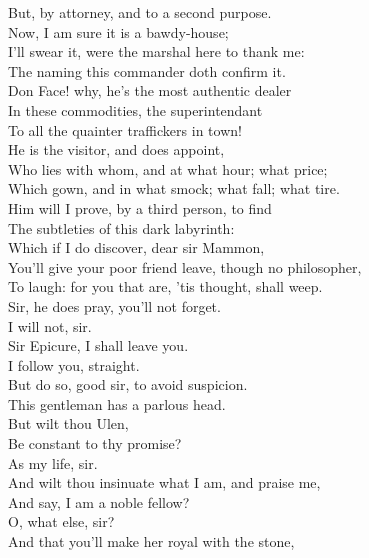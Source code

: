 \documentclass[a4paper,oneside]{memoir}
\begin{document}
\begin{drama*}
But, by attorney, and to a second purpose.\\
Now, I am sure it is a bawdy-house;\\
I'll swear it, were the marshal here to thank me:\\
The naming this commander doth confirm it.\\
Don Face! why, he's the most authentic dealer\\
In these commodities, the superintendant\\
To all the quainter traffickers in town!\\
He is the visitor, and does appoint,\\
Who lies with whom, and at what hour; what price;\\
Which gown, and in what smock; what fall; what tire.\\
Him will I prove, by a third person, to find\\
The subtleties of this dark labyrinth:\\
Which if I do discover, dear sir Mammon,\\
You'll give your poor friend leave, though no philosopher,\\
To laugh: for you that are, 'tis thought, shall weep.\\
\facespeaks Sir, he does pray, you'll not forget.\\
\surlyspeaks {} I will not, sir.\\
Sir Epicure, I shall leave you.\\
\mammonspeaks {} I follow you, straight.\\
\facespeaks But do so, good sir, to avoid suspicion.\\
This gentleman has a parlous head.\\
\mammonspeaks {} But wilt thou Ulen,\\
Be constant to thy promise?\\
\facespeaks {} As my life, sir.\\
\mammonspeaks And wilt thou insinuate what I am, and praise me,\\
And say, I am a noble fellow?\\
\facespeaks {} O, what else, sir?\\
And that you'll make her royal with the stone,\\

\end{drama*}
\end{document}
